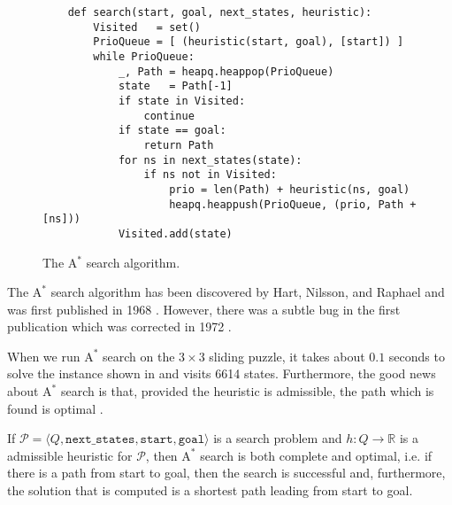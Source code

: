 \begin{figure}[!ht]
\centering
\begin{verbatim}
    def search(start, goal, next_states, heuristic):
        Visited   = set()
        PrioQueue = [ (heuristic(start, goal), [start]) ]
        while PrioQueue:
            _, Path = heapq.heappop(PrioQueue)
            state   = Path[-1]
            if state in Visited:
                continue
            if state == goal:
                return Path
            for ns in next_states(state):           
                if ns not in Visited:
                    prio = len(Path) + heuristic(ns, goal)
                    heapq.heappush(PrioQueue, (prio, Path + [ns]))
            Visited.add(state)
\end{verbatim}
\vspace*{-0.3cm}
\caption{The A$^*$ search algorithm.}
\label{fig:A-Star-Search.ipynb}
\end{figure}
The $\mathrm{A}^*$ search algorithm has been discovered by Hart, Nilsson, and Raphael and was first published in
1968 \cite{hart:1968}.  However, there was a subtle bug in the first publication which was corrected
in 1972 \cite{hart:1972}.

When we run $\mathrm{A}^*$ search on the $3 \times 3$ sliding puzzle, it takes about $0.1$ seconds to solve the instance
shown in  and visits 6614 states.
Furthermore, the good news about $\mathrm{A}^*$ search is that, provided the heuristic is admissible, the path which is
found is optimal \cite{hart:1972}.

\begin{Theorem} \hspace*{\fill} \linebreak
  If $\mathcal{P} = \langle Q, \mathtt{next\_states}, \mathtt{start}, \mathtt{goal}\rangle$ is a search problem   and 
  $h: Q \rightarrow \mathbb{R}$ is a admissible heuristic for $\mathcal{P}$,
  then $\mathrm{A}^*$ search is both complete and optimal, i.e. if there is a path from start to goal, then
  the search is successful and, furthermore, the solution that is computed is a shortest path leading from 
  start to goal. 
\end{Theorem}

